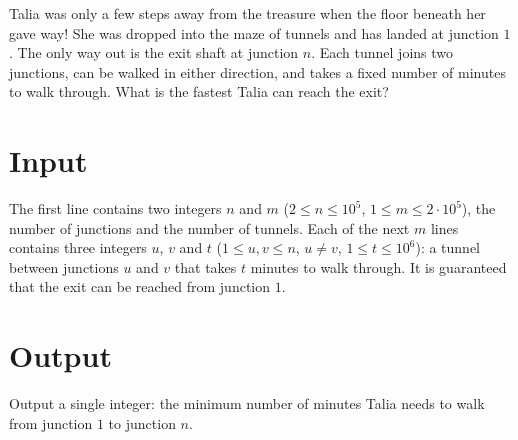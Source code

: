 
Talia was only a few steps away from the treasure when the floor beneath 
her gave way! She was dropped into the maze of tunnels and has landed at junction $1$. 
The only way out is the exit shaft at junction $n$. Each tunnel joins two junctions, 
can be walked in either direction, and takes a fixed number of minutes to walk through. 
What is the fastest Talia can reach the exit?

\section*{Input}
The first line contains two integers $n$ and $m$
($2 \le n \le 10^5$, $1 \le m \le 2 \cdot 10^5$), the number of junctions and
the number of tunnels. Each of the next $m$ lines contains three integers
$u$, $v$ and $t$ ($1 \le u, v \le n$, $u \ne v$, $1 \le t \le 10^6$): a tunnel
between junctions $u$ and $v$ that takes $t$ minutes to walk through.
It is guaranteed that the exit can be reached from junction $1$.

\section*{Output}
Output a single integer: the minimum number of minutes Talia needs to walk
from junction $1$ to junction $n$.
